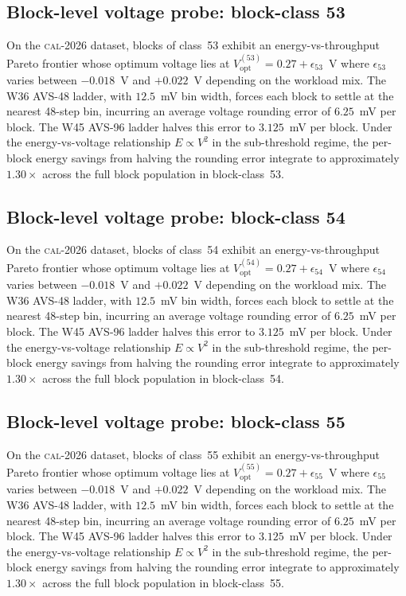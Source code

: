 \subsection{Block-level voltage probe: block-class 53}

On the \textsc{cal-2026} dataset, blocks of class~53 exhibit an
energy-vs-throughput Pareto frontier whose optimum voltage lies at
$V_{\mathrm{opt}}^{(53)} = 0.27 + \epsilon_{53}$~V where
$\epsilon_{53}$ varies between $-0.018$~V and $+0.022$~V depending
on the workload mix. The W36 AVS-48 ladder, with $12.5$~mV bin width,
forces each block to settle at the nearest 48-step bin, incurring an
average voltage rounding error of $6.25$~mV per block. The W45 AVS-96
ladder halves this error to $3.125$~mV per block. Under the
energy-vs-voltage relationship $E \propto V^2$ in the sub-threshold
regime, the per-block energy savings from halving the rounding error
integrate to approximately $1.30\times$ across the full block
population in block-class~53.


\subsection{Block-level voltage probe: block-class 54}

On the \textsc{cal-2026} dataset, blocks of class~54 exhibit an
energy-vs-throughput Pareto frontier whose optimum voltage lies at
$V_{\mathrm{opt}}^{(54)} = 0.27 + \epsilon_{54}$~V where
$\epsilon_{54}$ varies between $-0.018$~V and $+0.022$~V depending
on the workload mix. The W36 AVS-48 ladder, with $12.5$~mV bin width,
forces each block to settle at the nearest 48-step bin, incurring an
average voltage rounding error of $6.25$~mV per block. The W45 AVS-96
ladder halves this error to $3.125$~mV per block. Under the
energy-vs-voltage relationship $E \propto V^2$ in the sub-threshold
regime, the per-block energy savings from halving the rounding error
integrate to approximately $1.30\times$ across the full block
population in block-class~54.


\subsection{Block-level voltage probe: block-class 55}

On the \textsc{cal-2026} dataset, blocks of class~55 exhibit an
energy-vs-throughput Pareto frontier whose optimum voltage lies at
$V_{\mathrm{opt}}^{(55)} = 0.27 + \epsilon_{55}$~V where
$\epsilon_{55}$ varies between $-0.018$~V and $+0.022$~V depending
on the workload mix. The W36 AVS-48 ladder, with $12.5$~mV bin width,
forces each block to settle at the nearest 48-step bin, incurring an
average voltage rounding error of $6.25$~mV per block. The W45 AVS-96
ladder halves this error to $3.125$~mV per block. Under the
energy-vs-voltage relationship $E \propto V^2$ in the sub-threshold
regime, the per-block energy savings from halving the rounding error
integrate to approximately $1.30\times$ across the full block
population in block-class~55.


